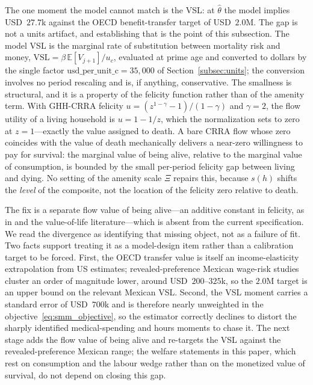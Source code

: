 \documentclass[12pt,a4paper]{article}
\newcommand{\E}{\mathbb{E}}
\begin{document}
The one moment the model cannot match is the VSL: at $\widehat\theta$ the model implies USD~$27.7$k against the OECD benefit-transfer target of USD~$2.0$M. The gap is not a units artifact, and establishing that is the point of this subsection. The model VSL is the marginal rate of substitution between mortality risk and money, $\mathrm{VSL}=\beta\,\E[V_{j+1}]/u_c$, evaluated at prime age and converted to dollars by the single factor $\text{usd\_per\_unit\_c}=35{,}000$ of Section~\ref{subsec:units}; the conversion involves no period rescaling and is, if anything, conservative. The smallness is structural, and it is a property of the felicity function rather than of the amenity term. With GHH-CRRA felicity $u=(z^{1-\gamma}-1)/(1-\gamma)$ and $\gamma=2$, the flow utility of a living household is $u=1-1/z$, which the normalization sets to zero at $z=1$---exactly the value assigned to death. A bare CRRA flow whose zero coincides with the value of death mechanically delivers a near-zero willingness to pay for survival: the marginal value of being alive, relative to the marginal value of consumption, is bounded by the small per-period felicity gap between living and dying. No setting of the amenity scale $\Xi$ repairs this, because $s(h)$ shifts the \emph{level} of the composite, not the location of the felicity zero relative to death.

The fix is a separate flow value of being alive---an additive constant in felicity, as in \citet{hall_jones_2007} and the value-of-life literature---which is absent from the current specification. We read the divergence as identifying that missing object, not as a failure of fit. Two facts support treating it as a model-design item rather than a calibration target to be forced. First, the OECD transfer value is itself an income-elasticity extrapolation from US estimates; revealed-preference Mexican wage-risk studies cluster an order of magnitude lower, around USD~$200$--$325$k, so the $2.0$M target is an upper bound on the relevant Mexican VSL. Second, the VSL moment carries a standard error of USD~$700$k and is therefore nearly unweighted in the objective~\eqref{eq:smm_objective}, so the estimator correctly declines to distort the sharply identified medical-spending and hours moments to chase it. The next stage adds the flow value of being alive and re-targets the VSL against the revealed-preference Mexican range; the welfare statements in this paper, which rest on consumption and the labour wedge rather than on the monetized value of survival, do not depend on closing this gap.
\end{document}
